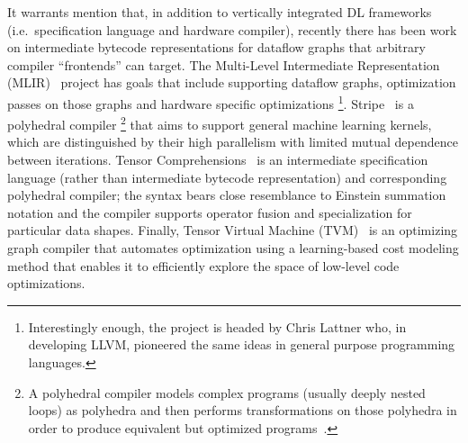 It warrants mention that, in addition to vertically integrated DL frameworks (i.e.\ specification language and hardware compiler), recently there has been work on intermediate bytecode representations for dataflow graphs that arbitrary compiler ``frontends'' can target.
The Multi-Level Intermediate Representation (MLIR)~\cite{lattner2020mlir} project has goals that include supporting dataflow graphs, optimization passes on those graphs and hardware specific optimizations%
\footnote{Interestingly enough, the project is headed by Chris Lattner who, in developing LLVM, pioneered the same ideas in general purpose programming languages.}.
Stripe~\cite{zerrell2019stripe} is a polyhedral compiler%
\footnote{A polyhedral compiler models complex programs (usually deeply nested loops) as polyhedra and then performs transformations on those polyhedra in order to produce equivalent but optimized programs~\cite{Griebl98codegeneration}.}
that aims to support general machine learning kernels, which are distinguished by their high parallelism with limited mutual dependence between iterations.
Tensor Comprehensions~\cite{vasilache2018tensor} is an intermediate specification language (rather than intermediate bytecode representation) and corresponding polyhedral compiler;
the syntax bears close resemblance to Einstein summation notation and the compiler supports operator fusion and specialization for particular data shapes.
Finally, Tensor Virtual Machine (TVM)~\cite{10.5555/3291168.3291211} is an optimizing graph compiler that automates optimization using a learning-based cost modeling method that enables it to efficiently explore the space of low-level code optimizations.
